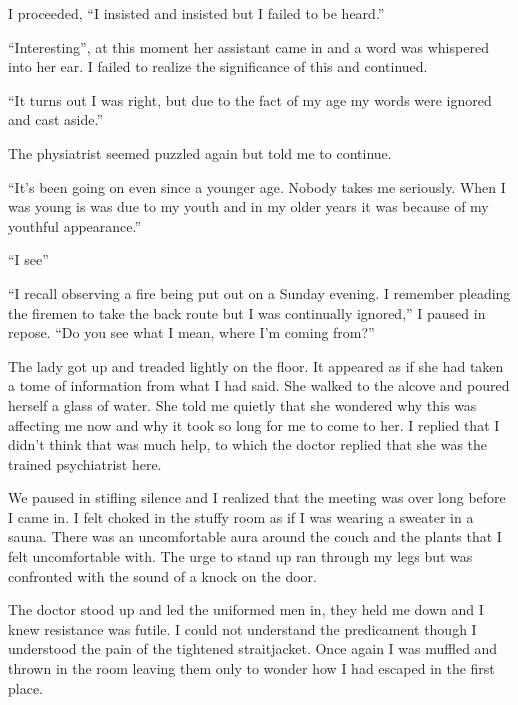 I proceeded, ``I insisted and insisted but I failed to be
heard.''



``Interesting'', at this moment her assistant came in and
a word was whispered into her ear. I failed to realize the
significance of this and continued.



``It turns out I was right, but due to the fact of my age my
words were ignored and cast aside.''



The physiatrist seemed puzzled again but told me to continue.



``It's been going on even since a younger age. Nobody
takes me seriously. When I was young is was due to my youth and in
my older years it was because of my youthful
appearance.''



``I see''



``I recall observing a fire being put out on a Sunday evening.
I remember pleading the firemen to take the back route but I was
continually ignored,'' I paused in repose. ``Do you see
what I mean, where I'm coming from?''



The lady got up and treaded lightly on the floor. It appeared as if
she had taken a tome of information from what I had said. She
walked to the alcove and poured herself a glass of water. She told
me quietly that she wondered why this was affecting me now and why
it took so long for me to come to her. I replied that I
didn't think that was much help, to which the doctor replied
that she was the trained psychiatrist here.



We paused in stifling silence and I realized that the meeting was
over long before I came in. I felt choked in the stuffy room as if
I was wearing a sweater in a sauna. There was an uncomfortable aura
around the couch and the plants that I felt uncomfortable with. The
urge to stand up ran through my legs but was confronted with the
sound of a knock on the door.



The doctor stood up and led the uniformed men in, they held me down
and I knew resistance was futile. I could not understand the
predicament though I understood the pain of the tightened
straitjacket. Once again I was muffled and thrown in the room
leaving them only to wonder how I had escaped in the first place. 

